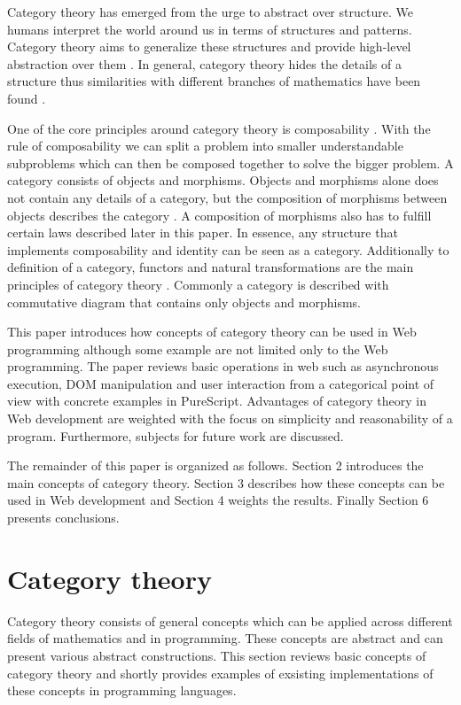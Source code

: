 \documentclass[article]{aaltoseries}
\begin{document}
  Category theory has emerged from the urge to abstract over structure. We
  humans interpret the world around us in terms of structures and patterns.
  Category theory aims to generalize these structures and provide high-level
  abstraction over them \cite{eilenberg1945general}. In general, category theory
  hides the details of a structure thus similarities with different branches of
  mathematics have been found \cite{lawvere1996adjointness}.

  One of the core principles around category theory is composability
  \cite{barr1990category}. With the rule of composability we can split a problem
  into smaller understandable subproblems which can then be composed together to
  solve the bigger problem. A category consists of objects and morphisms.
  Objects and morphisms alone does not contain any details of a category, but
  the composition of morphisms between objects describes the category
  \cite{computational, barr1990category}. A composition of morphisms also has to
  fulfill certain laws described later in this paper. In essence, any structure
  that implements composability and identity can be seen as a category.
  Additionally to definition of a category, functors and natural transformations
  are the main principles of category theory \cite{awodey2006category,
    computational}. Commonly a category is described with commutative diagram
  that contains only objects and morphisms.
 
  This paper introduces how concepts of category theory can be used in Web
  programming although some example are not limited only to the Web programming.
  The paper reviews basic operations in web such as asynchronous execution, DOM
  manipulation and user interaction from a categorical point of view with
  concrete examples in PureScript. Advantages of category theory in Web
  development are weighted with the focus on simplicity and reasonability of a
  program. Furthermore, subjects for future work are discussed.
 
  The remainder of this paper is organized as follows. Section 2 introduces the
  main concepts of category theory. Section 3 describes how these concepts can
  be used in Web development and Section 4 weights the results. Finally Section
  6 presents conclusions.


\section{Category theory}
Category theory consists of general concepts which can be applied across
different fields of mathematics and in programming. These concepts are abstract
and can present various abstract constructions. This section reviews
basic concepts of category theory and shortly provides examples of exsisting
implementations of these concepts in programming languages.
\end{document}
